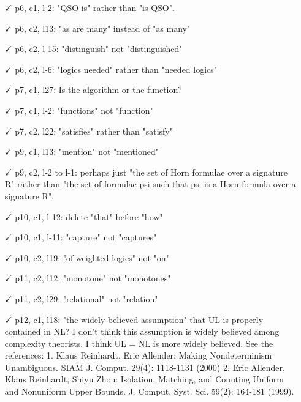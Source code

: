 \begin{itemize}
\item[$\checkmark$] p6, c1, l-2: "QSO is" rather than "is QSO".

\item[$\checkmark$] p6, c2, l13: "as are many" instead of "as many"

\item[$\checkmark$] p6, c2, l-15: "distinguish" not "distinguished"

\item[$\checkmark$] p6, c2, l-6: "logics needed" rather than "needed logics"

\item[$\checkmark$] p7, c1, l27: Is  the algorithm or the function?

\item[$\checkmark$] p7, c1, l-2: "functions" not "function"

\item[$\checkmark$] p7, c2, l22: "satisfies" rather than "satisfy"

\item[$\checkmark$] p9, c1, l13: "mention" not "mentioned"

\item[$\checkmark$] p9, c2, l-2 to l-1: perhaps just "the set of Horn formulae over a
signature R" rather than "the set of formulae psi such that psi is
a Horn formula over a signature R".

\item[$\checkmark$] p10, c1, l-12: delete "that" before "how"

\item[$\checkmark$] p10, c1, l-11: "capture" not "captures"

\item[$\checkmark$] p10, c2, l19: "of weighted logics" not "on"

\item[$\checkmark$] p11, c2, l12: "monotone" not "monotones"

\item[$\checkmark$] p11, c2, l29: "relational" not "relation"

\item[$\checkmark$] p12, c1, l18: "the widely believed assumption" that UL is properly
contained in NL? I don't think this assumption is widely believed
among complexity theorists. I think UL = NL is more widely
believed. See the references:
1. Klaus Reinhardt, Eric Allender: Making Nondeterminism
Unambiguous. SIAM J. Comput. 29(4): 1118-1131 (2000)
2. Eric Allender, Klaus Reinhardt, Shiyu Zhou: Isolation, Matching,
and Counting Uniform and Nonuniform Upper Bounds. 
J. Comput. Syst. Sci. 59(2): 164-181 (1999).
\end{itemize}

